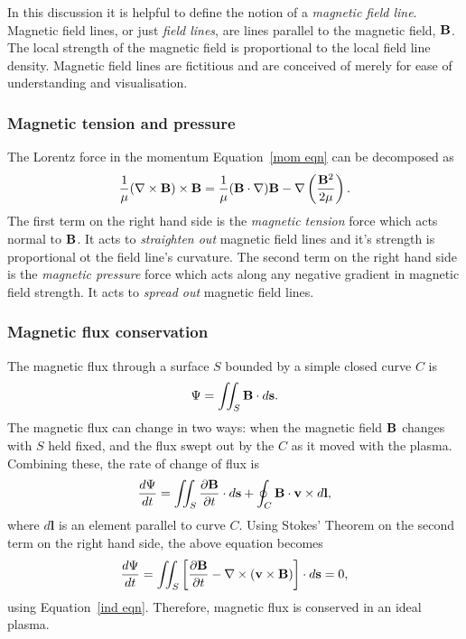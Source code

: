 \documentclass[12pt]{../style-files/ociamthesis}
\begin{document}
In this discussion it is helpful to define the notion of a \textit{magnetic field line}. Magnetic field lines, or just \textit{field lines}, are lines parallel to the magnetic field, $\mathbf{B}$. The local strength of the magnetic field is proportional to the local field line density. Magnetic field lines are fictitious and are conceived of merely for ease of understanding and visualisation.


\subsubsection{Magnetic tension and pressure}
The Lorentz force in the momentum Equation~\eqref{mom eqn} can be decomposed as
\begin{equation}
	\frac{1}{\mu}(\nabla\times\mathbf{B})\times\mathbf{B} = \frac{1}{\mu}(\mathbf{B}\cdot\nabla)\mathbf{B} - \nabla\left(\frac{\mathbf{B}^2}{2\mu}\right).
\end{equation}
The first term on the right hand side is the \textit{magnetic tension} force which acts normal to $\mathbf{B}$. It acts to \textit{straighten out} magnetic field lines and it's strength is proportional ot the field line's curvature. The second term on the right hand side is the \textit{magnetic pressure} force which acts along any negative gradient in magnetic field strength. It acts to \textit{spread out} magnetic field lines.


\subsubsection{Magnetic flux conservation} \label{sec: mag flux conservation}
The magnetic flux through a surface $S$ bounded by a simple closed curve $C$ is
\begin{equation}
	\Psi = \iint_S \mathbf{B}\cdot d\mathbf{s}.
\end{equation}
The magnetic flux can change in two ways: when the magnetic field $\mathbf{B}$ changes with $S$ held fixed, and the flux swept out by the $C$ as it moved with the plasma. Combining these, the rate of change of flux is
\begin{equation}
	\frac{d \Psi}{dt} = \iint_S \frac{\partial\mathbf{B}}{\partial t}\cdot d\mathbf{s} + \oint_C \mathbf{B}\cdot \mathbf{v} \times d\mathbf{l},
\end{equation}
where $d\mathbf{l}$ is an element parallel to curve $C$. Using Stokes' Theorem on the second term on the right hand side, the above equation becomes
\begin{equation}
\frac{d \Psi}{dt} = \iint_S \left[ \frac{\partial\mathbf{B}}{\partial t} - \nabla\times(\mathbf{v}\times\mathbf{B}) \right] \cdot d\mathbf{s} = 0,
\end{equation}
using Equation~\eqref{ind eqn}. Therefore, magnetic flux is conserved in an ideal plasma.
\end{document}
